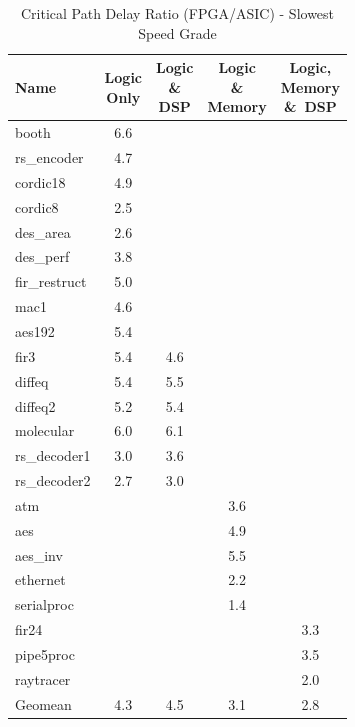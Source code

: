 \begin{table}[htbp]
\centering
\caption{Critical Path Delay Ratio (FPGA/ASIC) - Slowest Speed Grade}
\label{tab:delay-ratio}
\begin{tabular}{lcccc}
\toprule
Name & \shortstack{Logic\\Only} & \shortstack{Logic\\\&\\DSP} & \shortstack{Logic\\\&\\Memory} & \shortstack{Logic,\\Memory\\\&\ DSP} \\
\midrule
booth        & 6.6 &     &     &     \\
rs\_encoder  & 4.7 &     &     &     \\
cordic18     & 4.9 &     &     &     \\
cordic8      & 2.5 &     &     &     \\
des\_area    & 2.6 &     &     &     \\
des\_perf    & 3.8 &     &     &     \\
fir\_restruct& 5.0 &     &     &     \\
mac1         & 4.6 &     &     &     \\
aes192       & 5.4 &     &     &     \\
fir3         & 5.4 & 4.6 &     &     \\
diffeq       & 5.4 & 5.5 &     &     \\
diffeq2      & 5.2 & 5.4 &     &     \\
molecular    & 6.0 & 6.1 &     &     \\
rs\_decoder1 & 3.0 & 3.6 &     &     \\
rs\_decoder2 & 2.7 & 3.0 &     &     \\
atm          &     &     & 3.6 &     \\
aes          &     &     & 4.9 &     \\
aes\_inv     &     &     & 5.5 &     \\
ethernet     &     &     & 2.2 &     \\
serialproc   &     &     & 1.4 &     \\
fir24        &     &     &     & 3.3 \\
pipe5proc    &     &     &     & 3.5 \\
raytracer    &     &     &     & 2.0 \\
\midrule
Geomean      & 4.3 & 4.5 & 3.1 & 2.8 \\
\bottomrule
\end{tabular}
\end{table}

